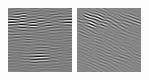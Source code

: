\begin{figure}
\begin{center}
  \includegraphics[width=\columnwidth/9]{ch4/figures/imag_-1_4.jpg}
  \includegraphics[width=\columnwidth/9]{ch4/figures/imag_-1_5.jpg}

\end{center}
\end{figure}
